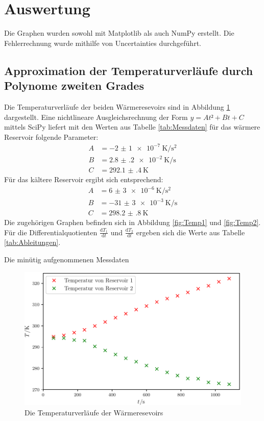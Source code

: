 \section{Auswertung}
\label{sec:Auswertung}

Die Graphen wurden sowohl mit Matplotlib \cite{matplotlib} als auch NumPy \cite{numpy} erstellt. 
Die Fehlerrechnung wurde mithilfe von Uncertainties \cite{uncertainties} durchgeführt.

\subsection{Approximation der Temperaturverläufe durch Polynome zweiten Grades}

Die Temperaturverläufe der beiden Wärmeresevoirs sind in Abbildung \ref{fig:Temperaturverläufe} dargestellt.
\noindent  Eine nichtlineare Ausgleichsrechnung der Form $y = At²+Bt+C$ mittels SciPy \cite{scipy} liefert mit den Werten aus Tabelle \ref{tab:Messdaten} für das wärmere Reservoir folgende Parameter:
\begin{align*}
	A &= \SI{-2(1)e-7}{\kelvin\per\second\squared}\\
	B &= \SI{2.8(2)e-2}{\kelvin\per\second}\\
	C &= \SI{292.1(4)}{\kelvin}
\end{align*}
Für das kältere Reservoir ergibt sich entsprechend:
\begin{align*}
	A &= \SI{6(3)e-6}{\kelvin\per\second\squared}\\
	B &= \SI{-31(3)e-3}{\kelvin\per\second}\\
	C &= \SI{298.2(8)}{\kelvin}
\end{align*}
Die zugehörigen Graphen befinden sich in Abbildung \ref{fig:Temp1} und \ref{fig:Temp2}.
Für die Differentialquotienten $\frac{\text{d}T_1}{\text{d}t}$ und $\frac{\text{d}T_2}{\text{d}t}$ ergeben sich die Werte aus Tabelle \ref{tab:Ableitungen}.
\begin{table}
 	\centering
  	\caption{Die minütig aufgenommenen Messdaten}	
   	\label{tab:Messdaten}
\end{table}
\begin{figure}
	\centering
	\includegraphics[scale = 1,keepaspectratio]
	{content/images/Temperaturen.pdf}
	\caption{Die Temperaturverläufe der Wärmeresevoirs}
	\label{fig:Temperaturverläufe}
\end{figure}
